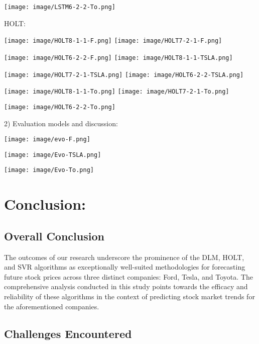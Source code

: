 \documentclass{ieeeojies}
\begin{document}
    \texttt{[image: image/LSTM6-2-2-To.png]}

HOLT:

    \texttt{[image: image/HOLT8-1-1-F.png]}
    \hspace{0.2cm}\texttt{[image: image/HOLT7-2-1-F.png]}
    
    \texttt{[image: image/HOLT6-2-2-F.png]}
    \hspace{0.2cm}\texttt{[image: image/HOLT8-1-1-TSLA.png]}
    
    \texttt{[image: image/HOLT7-2-1-TSLA.png]}
    \hspace{0.22cm}\texttt{[image: image/HOLT6-2-2-TSLA.png]}
    
    \texttt{[image: image/HOLT8-1-1-To.png]}
    \hspace{0.2cm}\texttt{[image: image/HOLT7-2-1-To.png]}
    
    \texttt{[image: image/HOLT6-2-2-To.png]}

2) Evaluation models and discussion:

    \texttt{[image: image/evo-F.png]}
 
    \texttt{[image: image/Evo-TSLA.png]}
    
    \texttt{[image: image/Evo-To.png]}


\section{Conclusion: }

\subsection{Overall Conclusion}

\hspace{0.3cm}The outcomes of our research underscore the prominence of the DLM, HOLT, and SVR algorithms as exceptionally well-suited methodologies for forecasting future stock prices across three distinct companies: Ford, Tesla, and Toyota. The comprehensive analysis conducted in this study points towards the efficacy and reliability of these algorithms in the context of predicting stock market trends for the aforementioned companies.

\subsection{Challenges Encountered}
\end{document}
